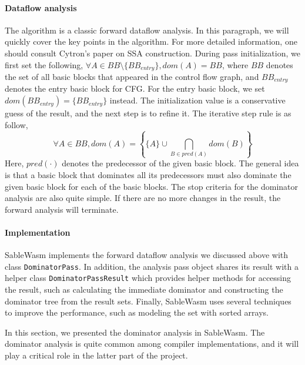 \paragraph{Dataflow analysis}
The algorithm is a classic forward dataflow analysis. In this paragraph, we will
quickly cover the key points in the algorithm. For more detailed information,
one should consult Cytron's paper on SSA construction. During pass
initialization, we first set the following,
$\forall A \in BB \setminus \{ BB_{entry} \}, dom(A) = BB$,
where $BB$ denotes the set of all basic blocks that appeared in the control flow
graph, and $BB_{entry}$ denotes the entry basic block for CFG. For the entry
basic block, we set $dom(BB_{entry}) = \{ BB_{entry} \}$ instead. The
initialization value is a conservative guess of the result, and the next step is
to refine it. The iterative step rule is as follow,
$$
    \forall A \in BB, dom(A) =
    \left\{\{ A \} \cup \bigcap_{B \in pred(A)} dom(B)\right\}
$$
Here, $pred(\cdot)$ denotes the predecessor of the given basic block. The
general idea is that a basic block that dominates all its predecessors must also
dominate the given basic block for each of the basic blocks. The stop criteria
for the dominator analysis are also quite simple. If there are no more changes
in the result, the forward analysis will terminate.

\paragraph{Implementation}
SableWasm implements the forward dataflow analysis we discussed above with class
\texttt{DominatorPass}. In addition, the analysis pass object shares its result
with a helper class \texttt{DominatorPassResult} which provides helper
methods for accessing the result, such as calculating the immediate dominator
and constructing the dominator tree from the result sets. Finally, SableWasm
uses several techniques to improve the performance, such as modeling the set
with sorted arrays.

In this section, we presented the dominator analysis in SableWasm. The dominator
analysis is quite common among compiler implementations, and it will play a
critical role in the latter part of the project.